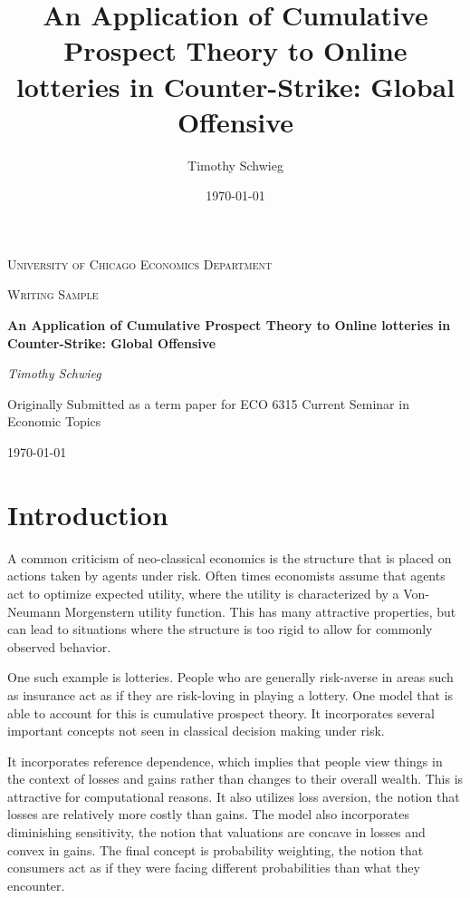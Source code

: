 \documentclass[12pt, letterpaper]{paper}
\author{Timothy Schwieg}
\date{\today}
\title{An Application of Cumulative Prospect Theory to Online lotteries in Counter-Strike: Global Offensive}
\renewcommand\maketitle{}
\begin{document}
\maketitle


\begin{titlepage}
\centering
{\scshape\LARGE University of Chicago Economics Department\par}
\vspace{1cm}
{\scshape\Large Writing Sample\par}
\vspace{1.5cm}
{\huge\bfseries An Application of Cumulative Prospect Theory to Online lotteries in Counter-Strike: Global Offensive\par}
\vspace{2cm}
{\Large\itshape Timothy Schwieg\par}
\vfill
Originally Submitted as a term paper for ECO 6315 Current Seminar in Economic Topics
\vfill

{\large \today\par}
\end{titlepage}

\section{Introduction}
\label{sec-1}
A common criticism of neo-classical economics is the structure that is
placed on actions taken by agents under risk. Often times economists
assume that agents act to optimize expected utility, where the utility
is characterized by a Von-Neumann Morgenstern utility function. This
has many attractive properties, but can lead to situations where the
structure is too rigid to allow for commonly observed behavior.

One such example is lotteries. People who are generally risk-averse in
areas such as insurance act as if they are risk-loving in playing a
lottery. One model that is able to account for this is cumulative
prospect theory. It incorporates several important concepts not seen
in classical decision making under risk.

It incorporates reference dependence, which implies that people view
things in the context of losses and gains rather than changes to their
overall wealth. This is attractive for computational reasons. It also
utilizes loss aversion, the notion that losses are relatively more
costly than gains. The model also incorporates diminishing
sensitivity, the notion that valuations are concave in losses and
convex in gains. The final concept is probability weighting, the
notion that consumers act as if they were facing different
probabilities than what they encounter.
\end{document}
